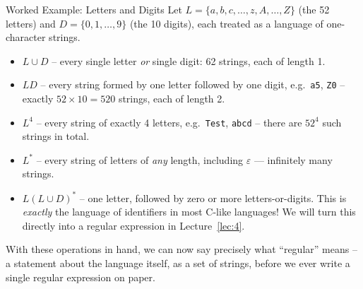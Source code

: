 \documentclass[full-course-notes.tex]{subfiles}
\begin{document}
\begin{examplebox}{Worked Example: Letters and Digits}
Let $L = \{a, b, c, \dots, z, A, \dots, Z\}$ (the 52 letters) and $D = \{0, 1, \dots, 9\}$ (the
10 digits), each treated as a language of one-character strings.
\begin{itemize}
  \item $L \cup D$ -- every single letter \emph{or} single digit: 62 strings, each of length 1.
  \item $LD$ -- every string formed by one letter followed by one digit, e.g.\ \texttt{a5},
  \texttt{Z0} -- exactly $52 \times 10 = 520$ strings, each of length 2.
  \item $L^{4}$ -- every string of exactly 4 letters, e.g.\ \texttt{Test}, \texttt{abcd} --
  there are $52^{4}$ such strings in total.
  \item $L^{*}$ -- every string of letters of \emph{any} length, including $\varepsilon$ ---
  infinitely many strings.
  \item $L(L \cup D)^{*}$ -- one letter, followed by zero or more letters-or-digits. This is
  \emph{exactly} the language of identifiers in most C-like languages! We will turn this
  directly into a regular expression in Lecture~\ref{lec:4}.
\end{itemize}
\end{examplebox}

\dbtag With these operations in hand, we can now say precisely what ``regular'' means -- a
statement about the language itself, as a set of strings, before we ever write a single regular
expression on paper.
\end{document}
